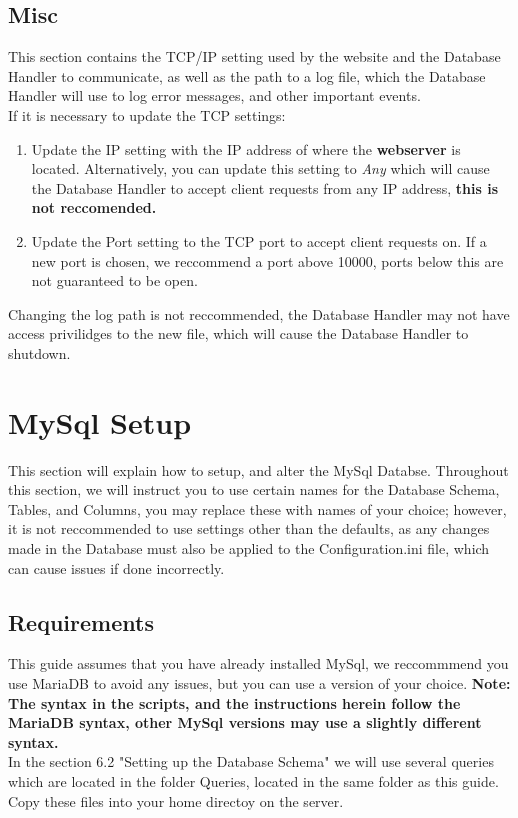 \documentclass[letterpaper]{article}
\begin{document}
	\subsection{Misc}
	This section contains the TCP/IP setting used by the website and the Database Handler to communicate, as well as the path to a log file, which the Database Handler will use to log error messages, and other important events. \\If it is necessary to update the TCP settings:
	\begin{enumerate}
		\item Update the IP setting with the IP address of where the \textbf{webserver} is located. Alternatively, you can update this setting to \textit{Any} which will cause the Database Handler to accept client requests from any IP address, \textbf{this is not reccomended.}
		\item Update the Port setting to the TCP port to accept client requests on. If a new port is chosen, we reccommend a port above 10000, ports below this are not guaranteed to be open.
	\end{enumerate}
	Changing the log path is not reccommended, the Database Handler may not have access privilidges to the new file, which will cause the Database Handler to shutdown.
	
	 
	\section{MySql Setup}
	This section will explain how to setup, and alter the MySql Databse. Throughout this section, we will instruct you to use certain names for the Database Schema, Tables, and Columns, you may replace these with names of your choice; however, it is not reccommended to use settings other than the defaults, as any changes made in the Database must also be applied to the Configuration.ini file, which can cause issues if done incorrectly.
	
	\subsection{Requirements}
	This guide assumes that you have already installed MySql, we reccommmend you use MariaDB to avoid any issues, but you can use a version of your choice. \textbf{Note: The syntax in the scripts, and the instructions herein follow the MariaDB syntax, other MySql versions may use a slightly different syntax.}\\In the section 6.2 "Setting up the Database Schema" we will use several queries which are located in the folder Queries, located in the same folder as this guide. Copy these files into your home directoy on the server.
	
\end{document}
